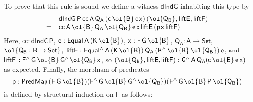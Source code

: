 \documentclass[sigplan,10pt,anonymous,review]{acmart}
\begin{document}
To prove that this rule is sound we define a witness
$\mathsf{dIndG}$ inhabiting this type by
\[\begin{array}{ll}
 & \mathsf{dIndG\,P\,cc\,A\,Q_A\,(c\,\ol{B}\,e\,x)\,(\ol{Q_B}, liftE, liftF)}\\
= & \mathsf{cc\,A\,\ol{B}\,Q_A\,\ol{Q_B}\,e\,x\,liftE\,(p\,x\,liftF)}
\end{array}\]
Here, $\mathsf{cc : dIndC\,P}$, $\mathsf{e : Equal\,A\,(K\,\ol{B})}$,
$\mathsf{x : F\,G\,\ol{B}}$, $\mathsf{Q_A : A \to Set}$,
$\ol{\mathsf{Q_B : B \to Set}}$, $\mathsf{liftE :
  Equal^{\wedge}\,A\,(K\,\ol{B})\,Q_A\,
  (K^{\wedge}\,\ol{B}\,\ol{Q_B})\,e}$, and $\mathsf{liftF}$ $\mathsf{:
  F^{\wedge}\,G\,\ol{B}\,G^{\wedge}\,{\ol{Q_B}}\,x}$, so
$\mathsf{(\ol{Q_B}, liftE, liftF) : G^{\wedge}\,A\,Q_A (c\,\ol{B}\,
  e\,x)}$ as expected.  Finally, the morphism of predicates
\[\mathsf{p : PredMap\,(F\,G\,\ol{B}) (F^{\wedge}\,G\,\ol{B}\,G^{\wedge}\,\ol{Q_B})
  (F^{\wedge}\,G\,\ol{B}\,P\,\ol{Q_B})}\] is defined by structural
induction on $\mathsf{F}$ as follows:
\end{document}
